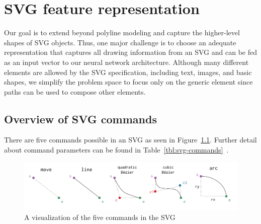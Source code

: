 \chapter{SVG feature representation}\label{chap:features}
Our goal is to extend beyond polyline modeling and capture the higher-level shapes of SVG objects.
Thus, one major challenge is to choose an adequate representation that captures all drawing information from an SVG and can be fed as an input vector to our neural network architecture.
Although many different elements are allowed by the SVG specification, including text, images, and basic shapes, we simplify the problem space to focus only on the generic  element since paths can be used to compose other elements. 

\section{Overview of SVG commands}
There are five commands possible in an SVG  as seen in Figure~\ref{fig:svg-commands}. Further detail about command parameters can be found in Table~\ref{tbl:svg-commands}~\cite{grasso2011svg}.

\begin{figure}[h]
    \centering
	\includegraphics[width=\textwidth]{figures/commands}
    \caption{A visualization of the five commands in the SVG \label{fig:svg-commands}}
\end{figure}


